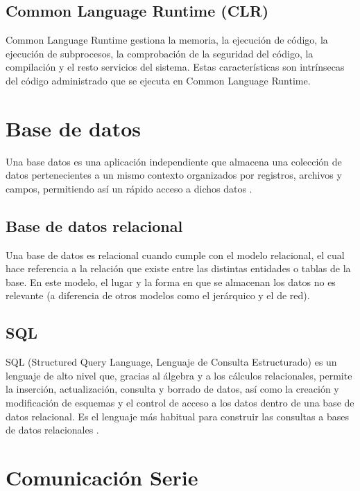 \subsection{Common Language Runtime (CLR)}

Common Language Runtime gestiona la memoria, la ejecución de código, la ejecución de subprocesos, la comprobación de la seguridad del código, la compilación y el resto servicios del sistema. Estas características son intrínsecas del código administrado que se ejecuta en Common Language Runtime.

\section{Base de datos}

Una base datos es una aplicación independiente que almacena una colección de datos pertenecientes a un mismo contexto organizados por registros, archivos y campos, permitiendo así un rápido acceso a dichos datos \cite{web:02bd}.

\subsection{Base de datos relacional}

Una base de datos es relacional cuando cumple con el modelo relacional, el cual hace referencia a la relación que existe entre las distintas entidades o tablas de la base. En este modelo, el lugar y la forma en que se almacenan los datos no es relevante (a diferencia de otros modelos como el jerárquico y el de red).

\subsection{SQL}

SQL (Structured Query Language, Lenguaje de Consulta Estructurado) es un lenguaje de alto nivel que, gracias al álgebra y a los cálculos relacionales, permite la inserción, actualización, consulta y borrado de datos, así como la creación y modificación de esquemas y el control de acceso a los datos dentro de una base de datos relacional. Es el lenguaje más habitual para construir las consultas a bases de datos relacionales \cite{web:03sql}.

\section{Comunicación Serie}

